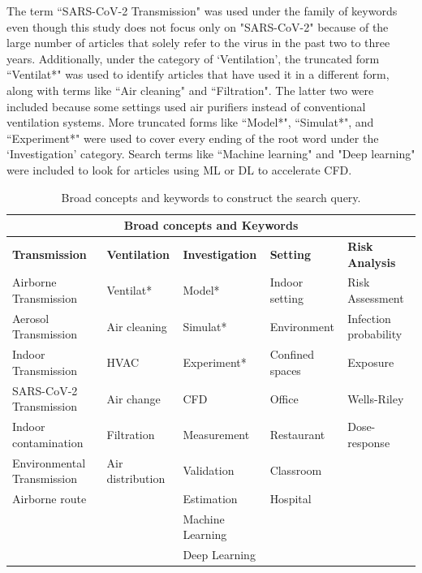 \documentclass[a4paper,12pt]{elsarticle}
\begin{document}
The term ``SARS-CoV-2 Transmission" was used under the family of keywords even though this study does not focus only on "SARS-CoV-2" because of the large number of articles that solely refer to the virus in the past two to three years. Additionally, under the category of `Ventilation', the truncated form ``Ventilat*" was used to identify articles that have used it in a different form, along with terms like ``Air cleaning" and ``Filtration". The latter two were included because some settings used air purifiers instead of conventional ventilation systems. More truncated forms like ``Model*", ``Simulat*", and ``Experiment*" were used to cover every ending of the root word under the `Investigation' category. Search terms like ``Machine learning" and "Deep learning" were included to look for articles using ML or DL to accelerate CFD.

{\renewcommand{\arraystretch}{1.1}
\begin{table}
\footnotesize
\captionsetup{font=normalsize}
    \begin{tabularx}{\textwidth}{|p{2.5cm}|X|p{2.5cm}|X|X|}
    \hline
    \multicolumn{5}{|c|}{\textbf{Broad concepts and Keywords}} \\
    \hline
    \textbf{Transmission} & \textbf{Ventilation} & \textbf{Investigation} & \textbf{Setting} & \textbf{Risk Analysis}\\
    \hline
    Airborne Transmission & Ventilat* & Model* & Indoor setting & Risk Assessment \\
    Aerosol Transmission & Air cleaning & Simulat* & Environment & Infection probability\\
    Indoor Transmission & HVAC & Experiment* & Confined spaces & Exposure \\         
    SARS-CoV-2 Transmission & Air change  & CFD & Office  & Wells-Riley\\        
    Indoor contamination & Filtration & Measurement & Restaurant & Dose-response\\        
    Environmental Transmission & Air distribution & Validation & Classroom & \\  
    Airborne route &  & Estimation & Hospital & \\
     &  & Machine Learning &  & \\
    &  & Deep Learning &  & \\
    \hline
    \end{tabularx}
    \caption{Broad concepts and keywords to construct the search query.}
    \label{tab:keys}
\end{table}
}
\end{document}
